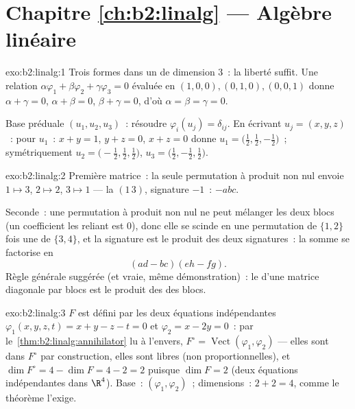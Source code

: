 \section*{Chapitre \ref{ch:b2:linalg} --- Algèbre linéaire}

\begin{solution}{exo:b2:linalg:1}
Trois formes dans un  de dimension $3$~: la liberté suffit. Une
relation $\alpha\varphi_1 + \beta\varphi_2 + \gamma\varphi_3 = 0$
évaluée en $(1,0,0), (0,1,0), (0,0,1)$ donne $\alpha + \gamma = 0$,
$\alpha + \beta = 0$, $\beta + \gamma = 0$, d'où $\alpha = \beta =
\gamma = 0$.

Base préduale $(u_1, u_2, u_3)$~: résoudre $\varphi_i(u_j) =
\delta_{ij}$. En écrivant $u_j = (x, y, z)$~: pour $u_1$~: $x + y = 1$,
$y + z = 0$, $x + z = 0$ donne $u_1 = \bigl(\tfrac12, \tfrac12,
-\tfrac12\bigr)$~; symétriquement $u_2 = \bigl(-\tfrac12, \tfrac12,
\tfrac12\bigr)$, $u_3 = \bigl(\tfrac12, -\tfrac12, \tfrac12\bigr)$.
\end{solution}

\begin{solution}{exo:b2:linalg:2}
Première matrice~: la seule permutation à produit non nul envoie $1 \mapsto
3$, $2 \mapsto 2$, $3 \mapsto 1$ --- la  $(1\,3)$,
signature $-1$~:  $-abc$.

Seconde~: une permutation à produit non nul ne peut mélanger les deux
blocs (un coefficient les reliant est $0$), donc elle se scinde en une
permutation de $\{1,2\}$ fois une de $\{3,4\}$, et la signature est le
produit des deux signatures~: la somme se factorise en
\[
(ad - bc)(eh - fg) .
\]
Règle générale suggérée (et vraie, même démonstration)~: le 
d'une matrice diagonale par blocs est le produit des  des
blocs.
\end{solution}

\begin{solution}{exo:b2:linalg:3}
$F$ est défini par les deux équations indépendantes $\varphi_1(x,y,z,t)
= x + y - z - t = 0$ et $\varphi_2 = x - 2y = 0$~: par
le~\cref{thm:b2:linalg:annihilator} lu à l'envers, $F^\circ =
\operatorname{Vect}(\varphi_1, \varphi_2)$ --- elles sont dans $F^\circ$
par construction, elles sont libres (non proportionnelles), et $\dim F^\circ
= 4 - \dim F = 4 - 2 = 2$ puisque $\dim F = 2$ (deux équations
indépendantes dans $\R^4$). Base~: $(\varphi_1, \varphi_2)$~; dimensions~:
$2 + 2 = 4$, comme le théorème l'exige.
\end{solution}

